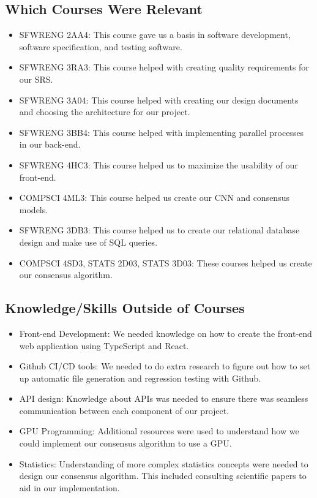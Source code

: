 \documentclass{article}
\begin{document}
\subsection{Which Courses Were Relevant}
\begin{itemize}
    \item SFWRENG 2AA4: This course gave us a basis in software development, software specification, and testing software.
    \item SFWRENG 3RA3: This course helped with creating quality requirements for our SRS.
    \item SFWRENG 3A04: This course helped with creating our design documents and choosing the architecture for our project.
    \item SFWRENG 3BB4: This course helped with implementing parallel processes in our back-end.
    \item SFWRENG 4HC3: This course helped us to maximize the usability of our front-end.
    \item COMPSCI 4ML3: This course helped us create our CNN and consensus models.
    \item SFWRENG 3DB3: This course helped us to create our relational database design and make use of SQL queries.
    \item COMPSCI 4SD3, STATS 2D03, STATS 3D03: These courses helped us create our consensus algorithm.
\end{itemize}
\subsection{Knowledge/Skills Outside of Courses}
\begin{itemize}
    \item Front-end Development: We needed knowledge on how to create the front-end web application using TypeScript and React.
    \item Github CI/CD tools: We needed to do extra research to figure out how to set up automatic file generation and regression testing with Github.
    \item API design: Knowledge about APIs was needed to ensure there was seamless communication between each component of our project.
    \item GPU Programming: Additional resources were used to understand how we could implement our consensus algorithm to use a GPU.
    \item Statistics: Understanding of more complex statistics concepts were needed to design our consensus algorithm. This included consulting scientific papers to aid in our implementation.
\end{itemize}
\end{document}
